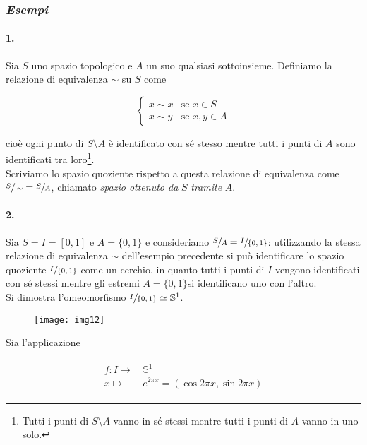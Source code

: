 \subsubsection{\textit{Esempi}}

\paragraph{1.}

Sia $ S $ uno spazio topologico e $ A $ un suo qualsiasi sottoinsieme. Definiamo la relazione di equivalenza $ \sim $ su $ S $ come

\begin{equation}
	\begin{cases}
		x \sim x & \text{se } x \in S\\
		x \sim y & \text{se } x,y \in A
	\end{cases}
\end{equation}

cioè ogni punto di $ S \setminus A $ è identificato con sé stesso mentre tutti i punti di $ A $ sono identificati tra loro\footnote{%
	Tutti i punti di $ S \setminus A $ vanno in sé stessi mentre tutti i punti di $ A $ vanno in uno solo.%
}.\\
Scriviamo lo spazio quoziente rispetto a questa relazione di equivalenza come $ \sfrac{S}{\sim} = \sfrac{S}{A} $, chiamato \textit{spazio ottenuto da} $ S $ \textit{tramite} $ A $.

\paragraph{2.}

Sia $ S = I = [0,1] $ e $ A = \{0,1\} $ e consideriamo $ \sfrac{S}{A} = \sfrac{I}{\{0,1\}} $: utilizzando la stessa relazione di equivalenza $ \sim $ dell'esempio precedente si può identificare lo spazio quoziente $ \sfrac{I}{\{0,1\}} $ come un cerchio, in quanto tutti i punti di $ I $ vengono identificati con sé stessi mentre gli estremi $ A = \{0,1\} $si identificano uno con l'altro.\\
Si dimostra l'omeomorfismo $ \sfrac{I}{\{0,1\}} \simeq \mathbb{S}^{1} $.

\begin{figure}[H]
	\centering
	\texttt{[image: img12]}
\end{figure}

Sia l'applicazione

\begin{align}
	\begin{split}
		f : I \to& \, \mathbb{S}^{1}\\
		x \mapsto& \, e^{2 \pi x} = (\cos 2 \pi x, \sin 2 \pi x)
	\end{split}
\end{align}


